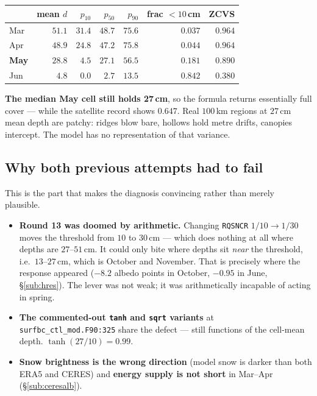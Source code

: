 \documentclass[10pt]{article}
\begin{document}
\begin{center}\footnotesize
\begin{tabular}{l r r r r r r}
\toprule
 & mean $d$ & $p_{10}$ & $p_{50}$ & $p_{90}$ & frac $<10$\,cm & ZCVS \\
\midrule
Mar & $51.1$ & $31.4$ & $48.7$ & $75.6$ & $0.037$ & $0.964$ \\
Apr & $48.9$ & $24.8$ & $47.2$ & $75.8$ & $0.044$ & $0.964$ \\
\textbf{May} & $28.8$ & $4.5$ & $\mathbf{27.1}$ & $56.5$ & $0.181$ & $\mathbf{0.890}$ \\
Jun & $4.8$ & $0.0$ & $2.7$ & $13.5$ & $0.842$ & $0.380$ \\
\bottomrule
\end{tabular}
\end{center}

\noindent \textbf{The median May cell still holds 27\,cm}, so the formula returns
essentially full cover --- while the satellite record shows $0.647$. Real
$100$\,km regions at $27$\,cm mean depth are patchy: ridges blow bare, hollows hold
metre drifts, canopies intercept. The model has no representation of that variance.

\subsection{Why both previous attempts had to fail}\label{sub:scffail}
This is the part that makes the diagnosis convincing rather than merely plausible.

\begin{itemize}\itemsep2pt
\item \textbf{Round 13 was doomed by arithmetic.} Changing \texttt{RQSNCR}
  $1/10\to1/30$ moves the threshold from $10$ to $30$\,cm --- which does nothing at
  all where depths are $27$--$51$\,cm. It could only bite where depths sit
  \emph{near} the threshold, i.e.\ $13$--$27$\,cm, which is October and November.
  That is precisely where the response appeared ($-8.2$ albedo points in October,
  $-0.95$ in June, \S\ref{sub:hres}). The lever was not weak; it was arithmetically
  incapable of acting in spring.
\item \textbf{The commented-out \texttt{tanh} and \texttt{sqrt} variants} at
  \texttt{surfbc\_ctl\_mod.F90:325} share the defect --- still functions of the
  cell-mean depth. $\tanh(27/10) = 0.99$.
\item \textbf{Snow brightness is the wrong direction} (model snow is darker than
  both ERA5 and CERES) and \textbf{energy supply is not short} in Mar--Apr
  (\S\ref{sub:ceresalb}).
\end{itemize}
\end{document}
